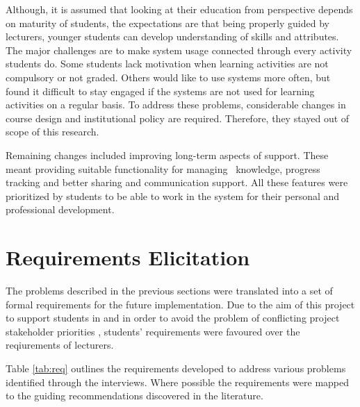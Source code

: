 Although, it is assumed that looking at their education from \LLLs
perspective depends on maturity of students, the expectations are that being
properly guided by lecturers, younger students can develop understanding of
\LLLs skills and attributes. The major challenges are to make system usage
connected through every activity students do. Some students lack motivation
when learning activities are not compulsory or not graded. Others would like to
use systems more often, but found it difficult to stay engaged if the systems
are not used for learning activities on a regular basis. To address these
problems, considerable changes in course design and institutional policy are
required. Therefore, they stayed out of scope of this research.

Remaining changes included improving long-term aspects of \LLLs support. These
meant providing suitable functionality for managing \ep~knowledge, progress
tracking and better sharing and communication support. All these features were
prioritized by students to be able to work in the system for their personal and
professional development. 

\section{Requirements Elicitation}

The problems described in the previous sections were translated into a set of
formal requirements for the future implementation. Due to the aim of this
project to support students in \LLLs and in order to avoid the problem of
conflicting project stakeholder priorities \citep{Leffingwell2011}, students'
requirements were favoured over the reqiurements of lecturers.

Table \ref{tab:req} outlines the requirements developed to address various
problems identified through the interviews. Where possible the requirements were
mapped to the guiding recommendations discovered in the literature.

